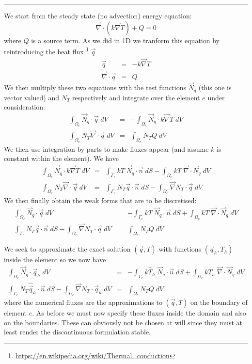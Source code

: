 \par\noindent\rule{\textwidth}{0.4pt}


We start from the steady state (no advection) energy equation:
\[
\vec\nabla\cdot (k \vec\nabla T) + Q = 0
\]
where $Q$ is a source term.
As we did in 1D we tranform this equation by reintroducing the heat flux
\footnote{\url{https://en.wikipedia.org/wiki/Thermal_conduction}} $\vec{q}$ 
\begin{eqnarray}
\vec q &=& - k \vec\nabla T \\
\vec\nabla \cdot \vec q &=& Q
\end{eqnarray}
We then multiply these two equations with the test functions $\vec{N}_q$ (this one 
is vector valued) and 
$N_T$ respectively and integrate over the element $e$ under consideration:
\begin{eqnarray}
\int_{\Omega_e} \vec{N}_q \cdot  \vec q  \; dV &=& - \int_{\Omega_e} \vec{N}_q \cdot k \vec\nabla T\; dV \\
\int_{\Omega_e} N_T \vec\nabla \cdot \vec q \;  dV &=& \int_{\Omega_e} N_T Q \; dV
\end{eqnarray}
We then use integration by parts to make fluxes appear (and assume $k$ is constant within 
the element). We have
\begin{eqnarray}
\int_{\Omega_e} \vec{N}_q \cdot k \vec\nabla T \; dV 
&=& \int_{\Gamma_e} kT \;  \vec{N}_q \cdot \vec{n} \; dS 
- \int _{\Omega_e}  kT \;  \vec\nabla\cdot \vec{N}_q  \;  dV \\
\int_{\Omega_e} N_T \vec\nabla \cdot \vec q \; dV 
&=& \int_{\Gamma_e} {N}_T \vec{q} \cdot \vec{n}  \; dS
- \int_{\Omega_e} \vec\nabla N_T \cdot \vec q \; dV 
\end{eqnarray}
We then finally obtain the weak forms that are to be discretised:
\begin{eqnarray}
\int_{\Omega_e} \vec{N}_q \cdot  \vec q \; dV &=& 
-\int_{\Gamma_e} kT \;  \vec{N}_q \cdot \vec{n} \; dS 
+ \int _{\Omega_e}  kT \;  \vec\nabla\cdot \vec{N}_q  \;  dV \\
\int_{\Gamma_e}    {N}_T  \vec{q}\cdot \vec{n}  \; dS
- \int_{\Omega_e} \vec\nabla N_T \cdot \vec q \; dV 
&=& \int_{\Omega_e} N_T Q \; dV
\end{eqnarray}

We seek to approximate the exact solution $(\vec{q},T)$ with functions $(\vec{q}_h,T_h)$ inside the element so we 
now have 
\begin{eqnarray}
\int_{\Omega_e} \vec{N}_q \cdot  \vec q_h \; dV &=& 
-\int_{\Gamma_e} k \hat{T}_h \;  \vec{N}_q \cdot \vec{n} \; dS 
+ \int _{\Omega_e}  k T_h \;  \vec\nabla\cdot \vec{N}_q  \;  dV \\
\int_{\Gamma_e}    {N}_T \hat{\vec{q}}_h \cdot \vec{n}  \; dS
- \int_{\Omega_e} \vec\nabla N_T \cdot \vec{q}_h \; dV 
&=& \int_{\Omega_e} N_T Q \; dV
\end{eqnarray}
where the numerical fluxes are the approximations to $(\vec{q},T)$ on the boundary of element $e$.
As before we must now specify these fluxes inside the domain and also on the boundaries. These
can obviously not be chosen at will since they must at least render the discontinuous formulation stable.



